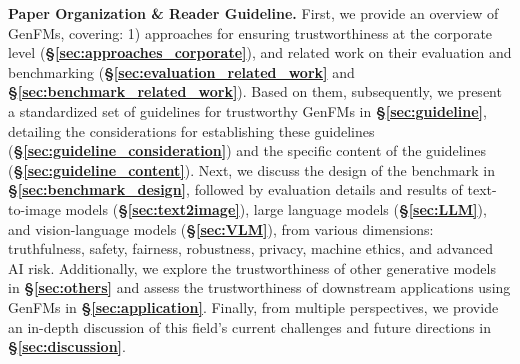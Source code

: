 \textbf{Paper Organization \& Reader Guideline.} First, we provide an overview of GenFMs, covering: 1) approaches for ensuring trustworthiness at the corporate level (\textbf{\S\ref{sec:approaches_corporate}}), and related work on their evaluation and benchmarking (\textbf{\S\ref{sec:evaluation_related_work}} and \textbf{\S\ref{sec:benchmark_related_work}}). Based on them, subsequently, we present a standardized set of guidelines for trustworthy GenFMs in \textbf{\S\ref{sec:guideline}}, detailing the considerations for establishing these guidelines (\textbf{\S\ref{sec:guideline_consideration}}) and the specific content of the guidelines (\textbf{\S\ref{sec:guideline_content}}). Next, we discuss the design of the benchmark in \textbf{\S\ref{sec:benchmark_design}}, followed by evaluation details and results of text-to-image models (\textbf{\S\ref{sec:text2image}}), large language models (\textbf{\S\ref{sec:LLM}}), and vision-language models (\textbf{\S\ref{sec:VLM}}), from various dimensions: truthfulness, safety, fairness, robustness, privacy, machine ethics, and advanced AI risk. Additionally, we explore the trustworthiness of other generative models in \textbf{\S\ref{sec:others}} and assess the trustworthiness of downstream applications using GenFMs in \textbf{\S\ref{sec:application}}. Finally, from multiple perspectives, we provide an in-depth discussion of this field's current challenges and future directions in \textbf{\S\ref{sec:discussion}}.

